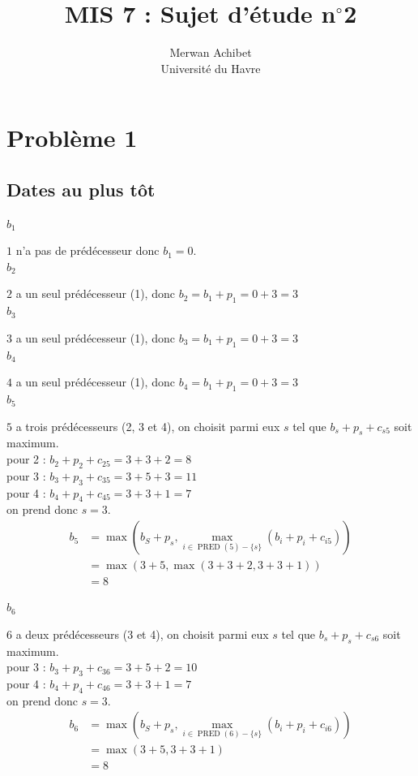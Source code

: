 \documentclass[12pt]{article}
\title{MIS 7 : Sujet d'étude n$^\circ$2}
\author{Merwan Achibet\\Université du Havre}
\date{}
\newcommand{\mmax}{\ensuremath{\operatorname{max}}}
\newcommand{\mpred}{\ensuremath{\operatorname{PRED}}}
\begin{document}
\maketitle

\section{Problème 1}

\subsection{Dates au plus tôt}

\underline{$b_1$}

$1$ n'a pas de prédécesseur donc $b_1 = 0$. \\

\underline{$b_2$}

$2$ a un seul prédécesseur (1), donc $b_2 = b_1 + p_1 = 0 + 3 = 3$ \\

\underline{$b_3$}

$3$ a un seul prédécesseur (1), donc $b_3 = b_1 + p_1 = 0 + 3 = 3$ \\

\underline{$b_4$}

$4$ a un seul prédécesseur (1), donc $b_4 = b_1 + p_1 = 0 + 3 = 3$ \\

\underline{$b_5$}

$5$ a trois prédécesseurs (2, 3 et 4), on choisit parmi eux $s$ tel
que $b_s + p_s + c_{s5}$ soit maximum.\\
pour 2 : $b_2 + p_2 + c_{25} = 3 + 3 + 2 = 8$\\
pour 3 : $b_3 + p_3 + c_{35} = 3 + 5 + 3 = 11$\\
pour 4 : $b_4 + p_4 + c_{45} = 3 + 3 + 1 = 7$\\
on prend donc $s = 3$.
\begin{align*}
  b_5 &= \mmax(b_S + p_s, \mmax_{i \in \mpred(5) - \{s\}}(b_i + p_i + c_{i5}))\\
  &= \mmax(3 + 5, \mmax(3 + 3 + 2, 3 + 3 + 1))\\
  &= 8
\end{align*}

\underline{$b_6$}

$6$ a deux prédécesseurs (3 et 4), on choisit parmi eux $s$ tel
que $b_s + p_s + c_{s6}$ soit maximum.\\
pour 3 : $b_3 + p_3 + c_{36} = 3 + 5 + 2 = 10$\\
pour 4 : $b_4 + p_4 + c_{46} = 3 + 3 + 1 = 7$\\
on prend donc $s = 3$.
\begin{align*}
  b_6 &= \mmax(b_S + p_s, \mmax_{i \in \mpred(6) - \{s\}}(b_i + p_i + c_{i6}))\\
  &= \mmax(3 + 5, 3 + 3 + 1)\\
  &= 8
\end{align*}
\end{document}
